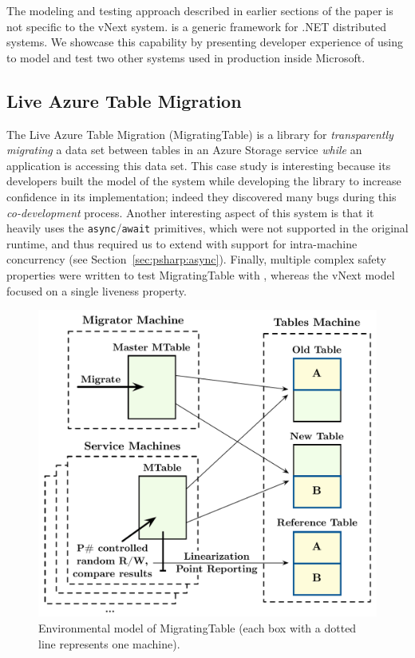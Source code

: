 The modeling and testing approach described in earlier sections of the paper is not specific to the vNext system. \psharp is a generic framework for .NET distributed systems. We showcase this capability by presenting developer experience of using \psharp to model and test two other systems used in production inside Microsoft.

\subsection{Live Azure Table Migration}
\label{sec:cases:migration}

The Live Azure Table Migration (MigratingTable) is a library for
\emph{transparently migrating} a data set between tables in an Azure Storage
service \emph{while} an application is accessing this data set. This case study
is interesting because its developers built the \psharp model of the system
while developing the library to increase confidence in its implementation;
indeed they discovered many bugs during this \emph{co-development} process.
Another interesting aspect of this system is that it heavily
uses the \texttt{async}/\texttt{await} primitives, which were not supported in
the original \psharp runtime, and thus required us to extend \psharp with
support for intra-machine concurrency (see Section~\ref{sec:psharp:async}). Finally, multiple 
complex safety properties were written to test MigratingTable with \psharp, 
whereas the vNext model focused on a single liveness property.

\begin{figure}[t]
\centering
\includegraphics[width=\linewidth]{img/mocked_migration}
\caption{Environmental model of MigratingTable (each box with a dotted line represents one \psharp machine).}
\label{fig:mockedmigration}
\end{figure}

